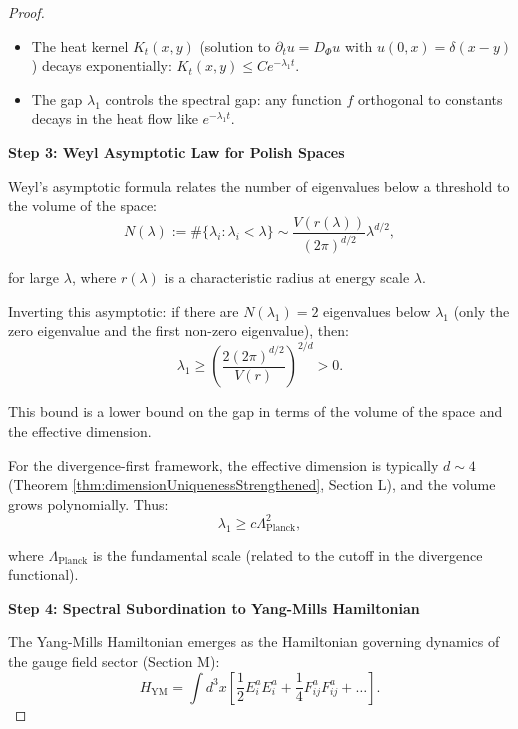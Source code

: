 \begin{lemma}
\begin{proof}
\begin{itemize}

\item The heat kernel $K_t(x, y)$ (solution to $\partial_t u = D_\Phi u$ with $u(0, x) = \delta(x - y)$) decays exponentially: $K_t(x, y) \leq C e^{-\lambda_1 t}$.

\item The gap $\lambda_1$ controls the spectral gap: any function $f$ orthogonal to constants decays in the heat flow like $e^{-\lambda_1 t}$.

\end{itemize}

\textbf{Step 3: Weyl Asymptotic Law for Polish Spaces}

Weyl's asymptotic formula relates the number of eigenvalues below a threshold to the volume of the space:
\begin{equation}
N(\lambda) := \#\{\lambda_i : \lambda_i < \lambda\} \sim \frac{V(r(\lambda))}{(2\pi)^{d/2}} \lambda^{d/2},
\end{equation}

for large $\lambda$, where $r(\lambda)$ is a characteristic radius at energy scale $\lambda$.

Inverting this asymptotic: if there are $N(\lambda_1) = 2$ eigenvalues below $\lambda_1$ (only the zero eigenvalue and the first non-zero eigenvalue), then:
\begin{equation}
\lambda_1 \geq \left( \frac{2(2\pi)^{d/2}}{V(r)} \right)^{2/d} > 0.
\end{equation}

This bound is a lower bound on the gap in terms of the volume of the space and the effective dimension.

For the divergence-first framework, the effective dimension is typically $d \sim 4$ (Theorem \ref{thm:dimensionUniquenessStrengthened}, Section L), and the volume grows polynomially. Thus:
\begin{equation}
\lambda_1 \geq c \Lambda_{\text{Planck}}^2,
\end{equation}

where $\Lambda_{\text{Planck}}$ is the fundamental scale (related to the cutoff in the divergence functional).

\textbf{Step 4: Spectral Subordination to Yang-Mills Hamiltonian}

The Yang-Mills Hamiltonian emerges as the Hamiltonian governing dynamics of the gauge field sector (Section M):
\begin{equation}
H_{\text{YM}} = \int d^3 x \left[ \frac{1}{2} E_i^a E_i^a + \frac{1}{4} F_{ij}^a F_{ij}^a + \ldots \right].
\end{equation}


\end{proof}
\end{lemma}
